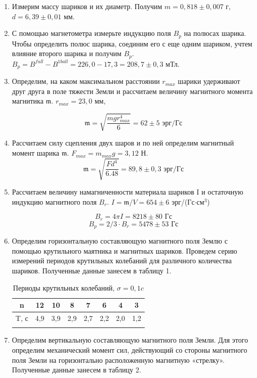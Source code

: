\documentclass[a4paper, 12pt]{article}%
\begin{document}
	\begin{enumerate}
		
		\item Измерим массу шариков и их диаметр. Получим $m = 0,818 \pm 0,007$ г, $d = 6,39 \pm 0,01$ мм.
		
		\item С помощью магнетометра измерьте индукцию поля $B_p$ на полюсах шарика. Чтобы определить полюс шарика, соединим его с еще одним шариком, учтем влияние второго шарика и получим $B_p$. $B_p = B^{full} - B^{1ball} = 226,0 - 17,3 = 208,7 \pm 0,3$ мТл.
		
		\item Определим, на каком максимальном расстоянии $r_{max}$ шарики удерживают друг друга в поле тяжести Земли и рассчитаем величину магнитного момента магнитика $\mathfrak m$. $r_{max} = 23,0 $ мм, 
		
		$$ \mathfrak m = \sqrt{\dfrac{mgr_{max}^4}{6}} = 62 \pm 5 \text{  эрг/Гс}$$ 
		
		\item Рассчитаем силу сцепления двух шаров и по ней определим магнитный момент шарика $\mathfrak m$. $F_{max} = m_{max} g = 3,12$ Н.
		$$ \mathfrak m = \sqrt{\dfrac{Fd^4}{6.48}} = 89,8 \pm 0,3\text{  эрг/Гс}$$
		 
		
		\item Рассчитаем величину намагниченности материала шариков I и
		остаточную индукцию магнитного поля $B_r$. $I = \mathfrak m / V = 654 \pm 6$ эрг/(Гс$\cdot$см$^3$)
		
		$$ B_r = 4\pi I =  8218 \pm 80 \text{  Гс}$$
		$$ B_p = 2/3 \cdot B_r = 5478 \pm 53 \text{  Гс}$$
		
		\item Определим горизонтальную составляющую магнитного поля Землю с помощью крутильного маятника и магнитных шариков. Проведем серию измерений периодов крутильных колебаний для различного количества шариков. Полученные данные занесем в таблицу 1.
		
		\begin{longtable} {|c|c|c|c|c|c|c|c|}
			\hline
			n & 12 & 10 & 8 & 7 & 6 & 4 & 3    \\ \hline
			T, с & 4,9 & 3,9 & 2,9 & 2,7 & 2,2 & 2,0 & 1,2\\ \hline
			\caption{Периоды крутильных колебаний, $\sigma = 0,1 c$}
		\end{longtable}
		
		\item Определим вертикальную составляющую магнитного поля Земли.
		Для этого определим механический момент сил, действующий со стороны магнитного поля Земли на горизонтально расположенную магнитную «стрелку». Полученные данные занесем в таблицу 2.
		

\end{enumerate}
\end{document}
